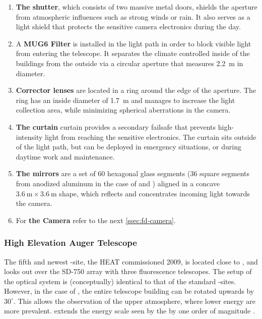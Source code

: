 \begin{enumerate}[label=(\Alph*)]
  \item \textbf{The shutter}, which consists of two massive metal doors, 
  shields the aperture from atmospheric influences such as strong winds or 
  rain. It also serves as a light shield that protects the sensitive camera 
  electronics during the day.

  \item A \textbf{MUG6 \UV Filter} is installed in the light path in order to 
  block visible light from entering the telescope. It separates the climate 
  controlled inside of the \FD buildings from the outside via a circular
  aperture that measures \SI{2.2}{\meter} in diameter. 
  
  \item \textbf{Corrector lenses} are located in a ring around the edge of the 
  aperture. The ring has an inside diameter of \SI{1.7}{\meter} and manages to 
  increase the light collection area, while minimizing spherical aberrations in
  the camera.

  \item \textbf{The curtain} curtain provides a secondary failsafe that 
  prevents high-intensity light from reaching the sensitive electronics. The 
  curtain sits outside of the light path, but can be deployed in emergency 
  situations, or during daytime work and maintenance.

  \item \textbf{The mirrors} are a set of 60 hexagonal glass segments (36 
  square segments from anodized aluminum in the case of \LL and \LM) aligned 
  in a concave $\SI{3.6}{\meter}\times\SI{3.6}{\meter}$ shape, which reflects 
  and concentrates incoming light towards the camera.

  \item For \textbf{the Camera} refer to the next \cref{ssec:fd-camera}.
\end{enumerate}

\subsubsection{High Elevation Auger Telescope}
\label{sssec:HEAT}

The fifth and newest \FD-site, the \acl{HEAT} commissioned 2009, is located 
close to \CO, and looks out over the SD-750 array with three fluorescence 
telescopes. The setup of the optical system is (conceptually) identical to that
of the standard \FD-sites. However, in the case of \HEAT, the entire telescope 
building can be rotated upwards by $30^\circ$. This allows the observation of 
the upper atmosphere, where lower energy \EASs are more prevalent. \HEAT 
extends the energy scale seen by the \FD by one order of magnitude 
\cite{mathesHEATTelescopesPierre2011}.

